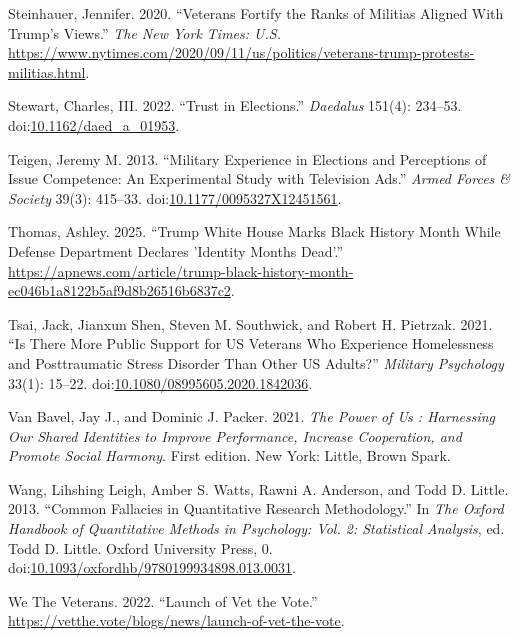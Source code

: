 \documentclass[
  12pt,
  letterpaper,
]{article}
\newlength{\cslhangindent}
\newenvironment{CSLReferences}[2] %
 {\begin{list}{}{%
  \setlength{\itemindent}{0pt}
  \setlength{\leftmargin}{0pt}
  \setlength{\parsep}{0pt}
  \ifodd #1
   \setlength{\leftmargin}{\cslhangindent}
   \setlength{\itemindent}{-1\cslhangindent}
  \fi
  \setlength{\itemsep}{#2\baselineskip}}}
 {\end{list}}
\begin{document}
\begin{CSLReferences}{1}{1}
Steinhauer, Jennifer. 2020. {``Veterans {Fortify} the {Ranks} of
{Militias Aligned With Trump}'s {Views}.''} \emph{The New York Times:
U.S.}
\url{https://www.nytimes.com/2020/09/11/us/politics/veterans-trump-protests-militias.html}.

Stewart, Charles, III. 2022. {``Trust in {Elections}.''} \emph{Daedalus}
151(4): 234--53.
doi:\href{https://doi.org/10.1162/daed_a_01953}{10.1162/daed\_a\_01953}.

Teigen, Jeremy M. 2013. {``Military {Experience} in {Elections} and
{Perceptions} of {Issue Competence}: {An Experimental Study} with
{Television Ads}.''} \emph{Armed Forces \& Society} 39(3): 415--33.
doi:\href{https://doi.org/10.1177/0095327X12451561}{10.1177/0095327X12451561}.

Thomas, Ashley. 2025. {``Trump {White House} Marks {Black History Month}
While {Defense Department} Declares 'Identity Months Dead'.''}
\url{https://apnews.com/article/trump-black-history-month-ec046b1a8122b5af9d8b26516b6837c2}.

Tsai, Jack, Jianxun Shen, Steven M. Southwick, and Robert H. Pietrzak.
2021. {``Is There More Public Support for {US Veterans} Who Experience
Homelessness and Posttraumatic Stress Disorder Than Other {US}
Adults?''} \emph{Military Psychology} 33(1): 15--22.
doi:\href{https://doi.org/10.1080/08995605.2020.1842036}{10.1080/08995605.2020.1842036}.

Van Bavel, Jay J., and Dominic J. Packer. 2021. \emph{The Power of Us :
Harnessing Our Shared Identities to Improve Performance, Increase
Cooperation, and Promote Social Harmony}. First edition. New York:
Little, Brown Spark.

Wang, Lihshing Leigh, Amber S. Watts, Rawni A. Anderson, and Todd D.
Little. 2013. {``Common {Fallacies} in {Quantitative Research
Methodology}.''} In \emph{The {Oxford Handbook} of {Quantitative
Methods} in {Psychology}: {Vol}. 2: {Statistical Analysis}}, ed. Todd D.
Little. Oxford University Press, 0.
doi:\href{https://doi.org/10.1093/oxfordhb/9780199934898.013.0031}{10.1093/oxfordhb/9780199934898.013.0031}.

We The Veterans. 2022. {``Launch of {Vet} the {Vote}.''}
\url{https://vetthe.vote/blogs/news/launch-of-vet-the-vote}.


\end{CSLReferences}
\end{document}
